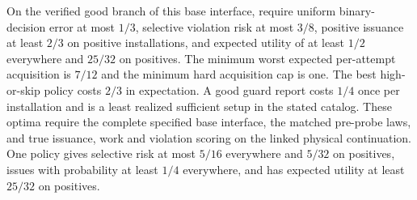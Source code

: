 \begin{theorem}\label{body:unified}
On the verified good branch of this base interface, require uniform binary-decision error at most \(1/3\), selective violation risk at most \(3/8\), positive issuance at least \(2/3\) on positive installations, and expected utility of at least \(1/2\) everywhere and \(25/32\) on positives. The minimum worst expected per-attempt acquisition is \(7/12\) and the minimum hard acquisition cap is one. The best high-or-skip policy costs \(2/3\) in expectation. A good guard report costs \(1/4\) once per installation and is a least realized sufficient setup in the stated catalog. These optima require the complete specified base interface, the matched pre-probe laws, and true issuance, work and violation scoring on the linked physical continuation. One policy gives selective risk at most \(5/16\) everywhere and \(5/32\) on positives, issues with probability at least \(1/4\) everywhere, and has expected utility at least \(25/32\) on positives.
\end{theorem}
